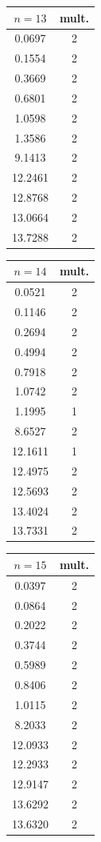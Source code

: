 \documentclass[JEP,XML,SOM,Unicode,ThmDefs,NoFloatCountersInSection,published]{cedram}
\theoremstyle{plain}
\theoremstyle{definition}
\begin{document}
\begin{table}
\medskip
\raisebox{12.5pt}
{\begin{minipage}{.2\textwidth}
\begin{tabular}{|c|c|}
\hline
$n = 13$ & mult.\\ \hline
0.0697&2 \\
0.1554&2 \\
0.3669&2 \\
0.6801&2 \\
1.0598&2 \\
1.3586&2 \\
9.1413&2 \\
12.2461&2 \\
12.8768&2 \\
13.0664&2 \\
13.7288&2 \\
\hline
\end{tabular}
\end{minipage}}
\begin{minipage}{.2\textwidth}
\begin{tabular}{|c|c|}
\hline
$n = 14$ & mult.\\ \hline
0.0521&2 \\
0.1146&2 \\
0.2694&2 \\
0.4994&2 \\
0.7918&2 \\
1.0742&2 \\
1.1995&1 \\
8.6527&2 \\
12.1611& 1 \\
12.4975&2 \\
12.5693&2 \\
13.4024&2 \\
13.7331&2 \\
\hline
\end{tabular}
\end{minipage}
\begin{minipage}{.2\textwidth}
\begin{tabular}{|c|c|}
\hline
$n = 15$ & mult.\\ \hline
0.0397&2 \\
0.0864&2 \\
0.2022&2 \\
0.3744&2 \\
0.5989&2 \\
0.8406&2 \\
1.0115&2 \\
8.2033&2 \\
12.0933&2 \\
12.2933&2 \\
12.9147&2 \\
13.6292&2 \\
13.6320&2 \\
\hline
\end{tabular}
\end{minipage}
\end{table}
\end{document}
